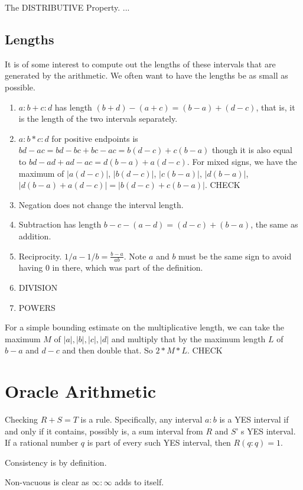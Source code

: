 \documentclass[12pt]{article}
\theoremstyle{remark}
\begin{document}
The DISTRIBUTIVE Property. ...

\subsection{Lengths}

It is of some interest to compute out the lengths of these intervals that are generated by the arithmetic. We often want to have the lengths be as small as possible. 

\begin{enumerate}
    \item $a:b + c:d$ has length $(b+d) - (a+c) = (b-a) + (d-c)$, that is, it is the length of the two intervals separately. 
    \item $a:b*c:d$ for positive endpoints is $bd-ac = bd -bc + bc -ac =  b(d-c) + c(b-a)$ though it is also equal to $bd - ad + ad - ac = d(b-a) + a(d-c)$. For mixed signs, we have the maximum of $|a(d-c)|$, $|b(d-c)|$, $|c(b-a)|$, $|d(b-a)|$, $|d(b-a)+a(d-c)| = |b(d-c) + c(b-a)|$.  CHECK
    \item Negation does not change the interval length. 
    \item Subtraction has length $b-c - (a-d) = (d-c) + (b-a)$, the same as addition.
    \item Reciprocity. $1/a - 1/b = \tfrac{b-a}{ab}$. Note $a$ and $b$ must be the same sign to avoid having 0 in there, which was part of the definition. 
    \item DIVISION
    \item POWERS
\end{enumerate}

For a simple bounding estimate on the multiplicative length, we can take the maximum $M$ of $|a|, |b|, |c|, |d|$ and multiply that by the maximum length $L$ of $b-a$ and $d-c$ and then double that. So $2*M*L$.  CHECK 


\section{Oracle Arithmetic}


Checking $R+S=T$ is a rule. Specifically, any interval $a:b$ is a YES interval if and only if it contains, possibly is, a sum interval from $R$ and $S$' s YES interval. If a rational number $q$ is part of every such YES interval, then $R(q:q) = 1$. 

Consistency is by definition. 

Non-vacuous is clear as $\infty:\infty$ adds to itself. 
\end{document}
